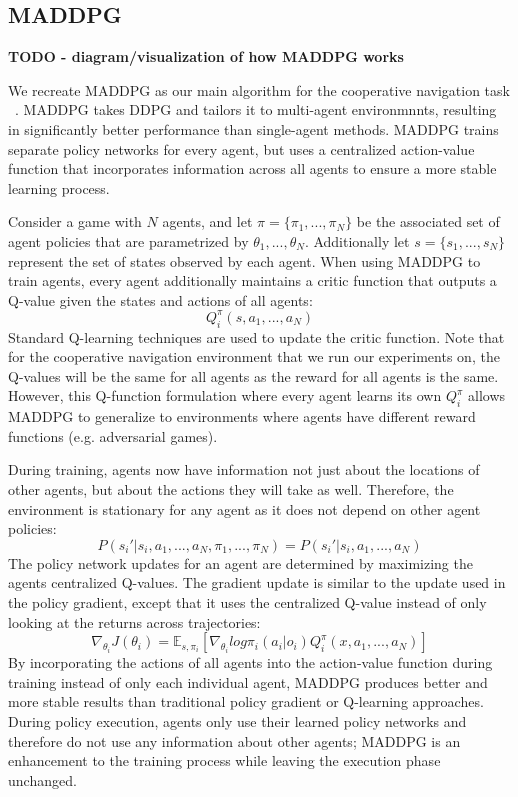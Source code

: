 \documentclass{article}
\begin{document}
\subsection{MADDPG}
\textbf{TODO - diagram/visualization of how MADDPG works}

We recreate MADDPG as our main algorithm for the cooperative navigation task ~\cite{maddpg}.  MADDPG takes DDPG and tailors it to multi-agent environmnnts, resulting in significantly better performance than single-agent methods. MADDPG trains separate policy networks for every agent, but uses a centralized action-value function that incorporates information across all agents to ensure a more stable learning process. 

Consider a game with $N$ agents, and let $\pi = \{\pi_1, ..., \pi_N\}$ be the associated set of agent policies that are parametrized by $\theta_1, ..., \theta_N$. Additionally let $s = \{s_1, ..., s_N\}$ represent the set of states observed by each agent. When using MADDPG to train agents, every agent additionally maintains a critic function that outputs a Q-value given the states and actions of all agents:
$$Q^\pi_i(s, a_1, ..., a_N)$$
Standard Q-learning techniques are used to update the critic function. Note that for the cooperative navigation environment that we run our experiments on, the Q-values will be the same for all agents as the reward for all agents is the same. However, this Q-function formulation where every agent learns its own $Q^\pi_i$ allows MADDPG to generalize to environments where agents have different reward functions (e.g. adversarial games).

During training, agents now have information not just about the locations of other agents, but about the actions they will take as well. Therefore, the environment is stationary for any agent as it does not depend on other agent policies:
$$P(s_i'|s_i, a_1, ..., a_N, \pi_1, ..., \pi_N) = P(s_i'|s_i, a_1, ..., a_N)$$
The policy network updates for an agent are determined by maximizing the agents centralized Q-values. The gradient update is similar to the update used in the policy gradient, except that it uses the centralized Q-value instead of only looking at the returns across trajectories:
$$\nabla_{\theta_i}J(\theta_i) = \mathbb{E}_{s, \pi_i}[\nabla_{\theta_i}log \pi_i(a_i|o_i)Q^{\pi}_i(x, a_1, ..., a_N)]$$
By incorporating the actions of all agents into the action-value function during training instead of only each individual agent, MADDPG produces better and more stable results than traditional policy gradient or Q-learning approaches. During policy execution, agents only use their learned policy networks and therefore do not use any information about other agents; MADDPG is an enhancement to the training process while leaving the execution phase unchanged.
\end{document}
